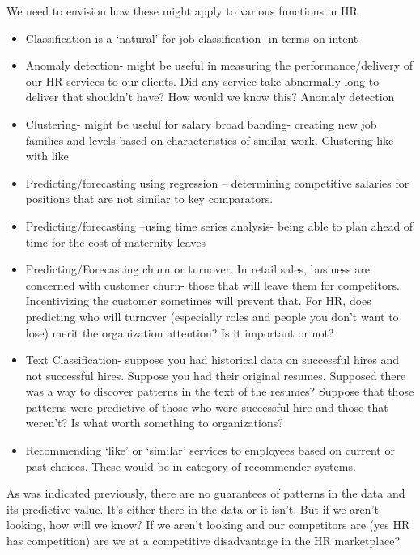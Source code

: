\documentclass[
]{article}
\begin{document}
We need to envision how these might apply to various functions in HR

\begin{itemize}
\item
  Classification is a `natural' for job classification- in terms on
  intent
\item
  Anomaly detection- might be useful in measuring the
  performance/delivery of our HR services to our clients. Did any
  service take abnormally long to deliver that shouldn't have? How would
  we know this? Anomaly detection
\item
  Clustering- might be useful for salary broad banding- creating new job
  families and levels based on characteristics of similar work.
  Clustering like with like
\item
  Predicting/forecasting using regression -- determining competitive
  salaries for positions that are not similar to key comparators.
\item
  Predicting/forecasting --using time series analysis- being able to
  plan ahead of time for the cost of maternity leaves
\item
  Predicting/Forecasting churn or turnover. In retail sales, business
  are concerned with customer churn- those that will leave them for
  competitors. Incentivizing the customer sometimes will prevent that.
  For HR, does predicting who will turnover (especially roles and people
  you don't want to lose) merit the organization attention? Is it
  important or not?
\item
  Text Classification- suppose you had historical data on successful
  hires and not successful hires. Suppose you had their original
  resumes. Supposed there was a way to discover patterns in the text of
  the resumes? Suppose that those patterns were predictive of those who
  were successful hire and those that weren't? Is what worth something
  to organizations?
\item
  Recommending `like' or `similar' services to employees based on
  current or past choices. These would be in category of recommender
  systems.
\end{itemize}

As was indicated previously, there are no guarantees of patterns in the
data and its predictive value. It's either there in the data or it
isn't. But if we aren't looking, how will we know? If we aren't looking
and our competitors are (yes HR has competition) are we at a competitive
disadvantage in the HR marketplace?
\end{document}
